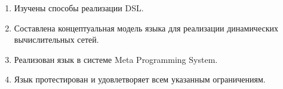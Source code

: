 \begin{enumerate}
	
	\item Изучены способы реализации DSL.
	\item Составлена концептуальная модель языка для реализации динамических вычислительных сетей.
	\item Реализован язык в системе Meta Programming System.
	\item Язык протестирован и удовлетворяет всем указанным ограничениям.
\end{enumerate}
